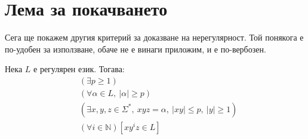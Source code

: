 \section{Лема за покачването}

Сега ще покажем другия критерий за доказване на нерегулярност.
Той понякога е по-удобен за използване, обаче не е винаги приложим, и е по-вербозен.

\begin{lemma}
    Нека $L$ е регулярен език. Тогава:
    \begin{align*}
         & (\exists p \geq 1)                                                             \\
         & (\forall \alpha \in L, \: |\alpha| \geq p)                                     \\
         & (\exists x, y, z \in \Sigma^*, \: xyz = \alpha, \: |xy| \leq p, \: |y| \geq 1) \\
         & (\forall i \in \mathbb{N}) [xy^iz \in L]
    \end{align*}
\end{lemma}

